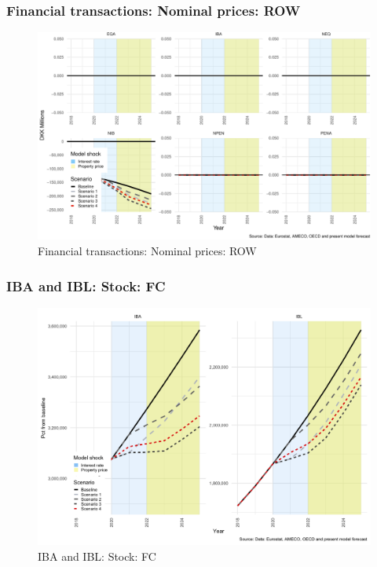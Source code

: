 \documentclass[
]{book}
\begin{document}
\hypertarget{financial-transactions-nominal-prices-row}{%
\subsubsection{Financial transactions: Nominal prices: ROW}\label{financial-transactions-nominal-prices-row}}

\begin{figure}
\centering
\includegraphics{figures/fl-fi-sfc-plot-fin-tr-ROW-1.pdf}
\caption{\label{fig:fl-fi-sfc-plot-fin-tr-ROW}Financial transactions: Nominal prices: ROW}
\end{figure}

\hypertarget{iba-and-ibl-stock-fc}{%
\subsubsection{IBA and IBL: Stock: FC}\label{iba-and-ibl-stock-fc}}

\begin{figure}[H]
\includegraphics[width=0.95\linewidth]{figures/fl-fi-sfc-plot-a-l-f-1} \caption{IBA and IBL: Stock: FC}\label{fig:fl-fi-sfc-plot-a-l-f}
\end{figure}
\end{document}
